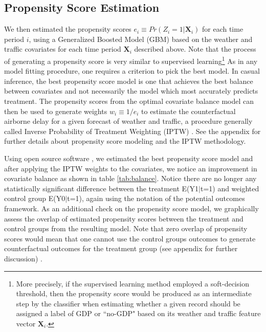 \documentclass[conference]{IEEEtran}
\begin{document}
\subsection{Propensity Score Estimation}
We then estimated the propensity scores $e_i \equiv Pr(Z_i=1|\mathbf{X}_i)$ for each time period $i$, using a Generalized Boosted Model (GBM) \cite{ridgeway2015toolkit} based on the weather and traffic covariates for each time period $\mathbf{X}_i$ described above.  Note that the process of generating a propensity score is very similar to supervised learning\footnote{More precisely, if the supervised learning method employed a soft-decision threshold, then the propensity score would be produced as an intermediate step by the classifier when estimating whether a given record should be assigned a label of GDP or ``no-GDP" based on its weather and traffic feature vector $\mathbf{X}_i$.} As in any model fitting procedure, one requires a criterion to pick the best model.  In casual inference, the best propensity score model is one that achieves the best balance between covariates and not necessarily the model which most accurately predicts treatment. The propensity scores from the optimal covariate balance model can then be used to generate weights $w_i \equiv 1/e_i$ to estimate the counterfactual airborne delay for a given forecast of weather and traffic, a procedure generally called Inverse Probability of Treatment Weighting (IPTW) \cite{austin2011introduction}.  See the appendix for further details about propensity score modeling and the IPTW methodology.  

Using open source software \cite{ridgeway2015toolkit}, we estimated the best propensity score model and after applying the IPTW weights to the covariates, we notice an improvement in covariate balance as shown in table \ref{tab:balance}. Notice there are no longer any statistically significant difference between the treatment E(Y1$|$t=1) and weighted control group E(Y0$|$t=1), again using the notation of the potential outcomes framework.  As an additional check on the propensity score model, we graphically assess the overlap of estimated propensity scores between the treatment and control groups from the resulting model.  Note that zero overlap of propensity scores would mean that one cannot use the control groups outcomes to generate counterfactual outcomes for the treatment group (see appendix for further discussion) \cite{austin2011tutorial}. 
\end{document}

